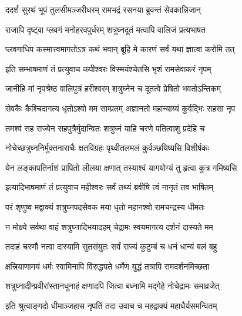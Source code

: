 \twolineshloka
{ददर्श सुरथं भूपं तुलसीमञ्जरीधरम्}
{रामभद्रं रसनया ब्रुवन्तं सेवकान्निजान्}%

\twolineshloka
{राजापि दृष्ट्वा प्लवगं मनोहरवपुर्धरम्}
{शत्रुघ्नदूतं मत्वापि वालिजं प्रत्यभाषत}%


\twolineshloka
{प्लवगाधिप कस्मात्त्वमागतोऽत्र कथं भवान्}
{ब्रूहि मे कारणं सर्वं यथा ज्ञात्वा करोमि तत्}%


\twolineshloka
{इति सम्भाषमाणं तं प्रत्युवाच कपीश्वरः}
{विस्मयंश्चेतसि भृशं रामसेवाकरं नृपम्}%

\twolineshloka
{जानीहि मां नृपश्रेष्ठ वालिपुत्रं हरीश्वरम्}
{शत्रुघ्नेन च दूतत्वे प्रेषितो भवतोऽन्तिकम्}%

\twolineshloka
{सेवकैः कैश्चिदागत्य धृतोऽश्वो मम साम्प्रतम्}
{अज्ञानतो महान्याय्यं कुर्वद्भिः सहसा नृप}%

\twolineshloka
{तमश्वं सह राज्येन सहपुत्रैर्मुदान्वितः}
{शत्रुघ्नं याहि चरणे पतित्वाशु प्रदेहि च}%

\twolineshloka
{नोचेच्छत्रुघ्ननिर्मुक्तनाराचैः क्षतविग्रहः}
{पृथ्वीतलमलं कुर्वञ्छयिष्यसि विशीर्षकः}%

\twolineshloka
{येन लङ्कापतिर्नाशं प्रापितो लीलया क्षणात्}
{तस्याश्वं यागयोग्यं तु हृत्वा कुत्र गमिष्यसि}%


\twolineshloka
{इत्यादिभाषमाणं तं प्रत्युवाच महीश्वरः}
{सर्वं तथ्यं ब्रवीषि त्वं नानृतं तव भाषितम्}%

\twolineshloka
{परं शृणुष्व मद्वाक्यं शत्रुघ्नपदसेवक}
{मया धृतो महानश्वो रामचन्द्रस्य धीमतः}%

\twolineshloka
{न मोक्ष्ये सर्वथा वाहं शत्रुघ्नादिभयादहम्}
{चेद्रामः स्वयमागत्य दर्शनं दास्यते मम}%

\twolineshloka
{तदाहं चरणौ नत्वा दास्यामि सुतसंयुतः}
{सर्वं राज्यं कुटुम्बं च धनं धान्यं बलं बहु}%

\twolineshloka
{क्षत्त्रियाणामयं धर्मः स्वामिनापि विरुद्ध्यते}
{धर्मेण युद्धं तत्रापि रामदर्शनमिच्छता}%

\twolineshloka
{शत्रुघ्नादीन्प्रवीरांस्तानधुनाहं क्षणादपि}
{जित्वा बध्नामि मद्गेहे नोचेद्रामः समाव्रजेत्}%


\twolineshloka
{इति श्रुत्वाङ्गदो धीमाञ्जहास नृपतिं तदा}
{उवाच च महद्वाक्यं महाधैर्यसमन्वितम्}%


